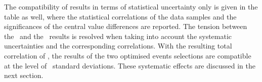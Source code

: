 %
The compatibility of results in terms of statistical uncertainty only is given in the table as well, where the statistical correlations of the data samples and the significances of the central value differences are reported.
%
The tension between the \cutbased\ and the \mvabased\ results is resolved when taking into account the systematic uncertainties and the corresponding correlations.
%
With the resulting total correlation of \BDTcutCorrelation, the results of the two optimised events selections are compatible at the level of \BDTcutCompatibility\ standard deviations. 
%
These systematic effects are discussed in the next section.









